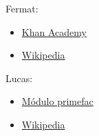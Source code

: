 \documentclass[12pt]{article}
\begin{document}
Fermat:
\begin{itemize}
  \item \href{https://goo.gl/fwCCM3}{Khan Academy}
  \item \href{https://en.wikipedia.org/wiki/Fermat_primality_test}
  {Wikipedia}
\end{itemize}

Lucas:
\begin{itemize}
  \item \href{https://github.com/elliptic-shiho/primefac-fork}
  {Módulo primefac}
  \item \href{https://en.wikipedia.org/wiki/Lucas_primality_test}
  {Wikipedia}
\end{itemize}
\end{document}
